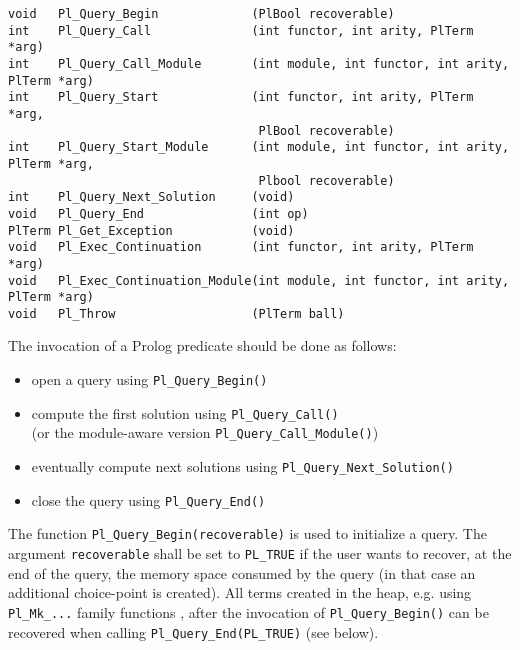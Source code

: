\begin{Indentation}
\begin{verbatim}
void   Pl_Query_Begin             (PlBool recoverable)
int    Pl_Query_Call              (int functor, int arity, PlTerm *arg)
int    Pl_Query_Call_Module       (int module, int functor, int arity, PlTerm *arg)
int    Pl_Query_Start             (int functor, int arity, PlTerm *arg,
                                   PlBool recoverable)
int    Pl_Query_Start_Module      (int module, int functor, int arity, PlTerm *arg, 
                                   Plbool recoverable)
int    Pl_Query_Next_Solution     (void)
void   Pl_Query_End               (int op)
PlTerm Pl_Get_Exception           (void)
void   Pl_Exec_Continuation       (int functor, int arity, PlTerm *arg)
void   Pl_Exec_Continuation_Module(int module, int functor, int arity, PlTerm *arg)
void   Pl_Throw                   (PlTerm ball)
\end{verbatim}
\end{Indentation}

The invocation of a Prolog predicate should be done as follows:

\begin{itemize}

\item open a query using \texttt{Pl\_Query\_Begin()}

\item compute the first solution using \texttt{Pl\_Query\_Call()}\\
  (or the module-aware version \texttt{Pl\_Query\_Call\_Module()})

\item eventually compute next solutions using
\texttt{Pl\_Query\_Next\_Solution()}

\item close the query using \texttt{Pl\_Query\_End()}

\end{itemize}

The function \texttt{Pl\_Query\_Begin(recoverable)} is used to initialize a
query. The argument \texttt{recoverable} shall be set to \texttt{PL\_TRUE} if
the user wants to recover, at the end of the query, the memory space consumed
by the query (in that case an additional choice-point is created). All terms
created in the heap, e.g. using \texttt{Pl\_Mk\_...}  family functions
, after the invocation of
\texttt{Pl\_Query\_Begin()} can be recovered when calling
\texttt{Pl\_Query\_End(PL\_TRUE)} (see below).

